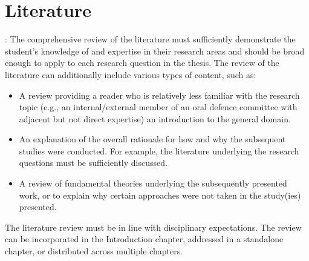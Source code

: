 \chapter*{\rm\bfseries Literature}
\label{ch:literature}

\mcgillguidelines: The comprehensive review of the literature must sufficiently demonstrate the student’s knowledge of and expertise in their research areas and should be broad enough to apply to each research question in the thesis. The review of the literature can additionally include various types of content, such as:

\begin{itemize}
    \item{A review providing a reader who is relatively less familiar with the research topic (e.g., an internal/external member of an oral defence committee with adjacent but not direct expertise) an introduction to the general domain.}
    \item{An explanation of the overall rationale for how and why the subsequent studies were conducted. For example, the literature underlying the research questions must be sufficiently discussed.}
    \item{A review of fundamental theories underlying the subsequently presented work, or to explain why certain approaches were not taken in the study(ies) presented.}
\end{itemize}

The literature review must be in line with disciplinary expectations. The review can be incorporated in the Introduction chapter, addressed in a standalone chapter, or distributed across multiple chapters.